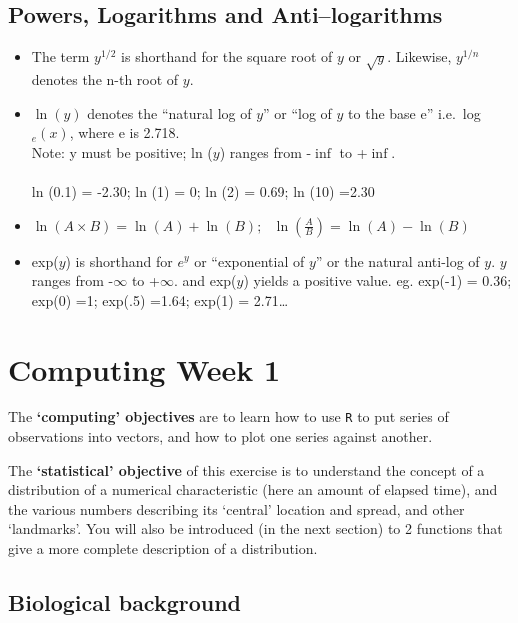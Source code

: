 \documentclass[]{book}
\begin{document}
\hypertarget{powers-logarithms-and-antilogarithms-1}{%
\section{Powers, Logarithms and Anti--logarithms}\label{powers-logarithms-and-antilogarithms-1}}

\begin{itemize}
\item
  The term \(y^{1/2}\) is shorthand for the square root of \(y\) or \(\sqrt{y}\). Likewise, \(y^{1/n}\) denotes the n-th root of \(y\).
\item
  \(\ln (y)\) denotes the ``natural log of \(y\)'' or ``log of \(y\) to
  the base e'' i.e.~log\(_e(x)\), where e is 2.718.\\
  Note: y must be positive; ln (\(y\)) ranges from -\(\inf\) to +\(\inf\).\\
  \hspace*{0.333em}\\
  ln (0.1) = -2.30; ln (1) = 0; ln (2) = 0.69; ln (10) =2.30
\item
  \(\ln(A \times B) = \ln(A) + \ln(B); \ \ \ \ln(\frac{A}{B}) = \ln(A) - \ln(B)\)
\item
  exp(\(y\)) is shorthand for \(e^y\) or ``exponential of \(y\)'' or the natural anti-log of \(y\). \(y\) ranges from -\(\infty\) to +\(\infty\). and exp(\(y\)) yields a positive value. eg. exp(-1) = 0.36; exp(0) =1; exp(.5) =1.64; exp(1) = 2.71\ldots{}
\end{itemize}

\hypertarget{computing01}{%
\chapter{Computing Week 1}\label{computing01}}

The \textbf{`computing' objectives} are to learn how to use \texttt{R} to put series of observations into vectors, and how to plot one series against another.

The \textbf{`statistical' objective} of this exercise is to understand the concept of a distribution of a numerical characteristic (here an amount of elapsed time), and the various numbers describing its `central' location and spread, and other `landmarks'. You will also be introduced (in the next section) to 2 functions that give a more complete description of a distribution.

\hypertarget{biological-background-1}{%
\section{Biological background}\label{biological-background-1}}
\end{document}
